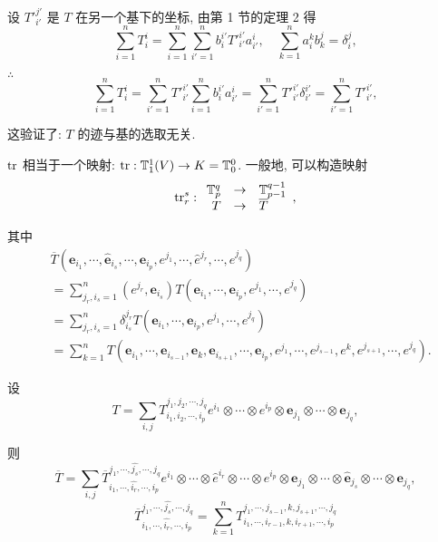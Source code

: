 \documentclass{ctexart}
\begin{document}
设 ${T'}_{i'}^{j'}$ 是 $T$ 在另一个基下的坐标, 由第 1 节的定理 2 得
\[\sum\limits_{i=1}^nT_i^i=\sum\limits_{i=1}^n\sum\limits_{i'=1}^nb_i^{i'}{T'}_{i'}^{i'}a_{i'}^i,\quad\sum\limits_{k=1}^na_i^kb_k^j=\delta_i^j,\]

$\therefore$
\[\sum\limits_{i=1}^nT_i^i=\sum\limits_{i'=1}^n{T'}_{i'}^{i'}\sum\limits_{i=1}^nb_i^{i'}a_{i'}^i=\sum\limits_{i'=1}^n{T'}_{i'}^{i'}\delta_{i'}^{i'}=\sum\limits_{i'=1}^n{T'}_{i'}^{i'},\]

这验证了: $T$ 的迹与基的选取无关.

$\operatorname{tr} $ 相当于一个映射: $\operatorname{tr} :\mathbb{T}_1^1(V)\to K=\mathbb{T}_0^0$. 一般地, 可以构造映射
\[\operatorname{tr} _r^s:\begin{array}{rcl}
    \mathbb{T}_p^q & \to & \mathbb{T}_{p-1}^{q-1} \\
    T & \to & \overline{T} \\
\end{array},\]

其中
\begin{align*}
    & \overline{T}(\boldsymbol{e}_{i_1},\cdots,\hat{\boldsymbol{e}}_{i_s},\cdots,\boldsymbol{e}_{i_p},e^{j_1},\cdots,\hat{e}^{j_r},\cdots,e^{j_q}) \\
    & =\sum\limits_{j_r,i_s=1}^n(e^{j_r},\boldsymbol{e}_{i_s})T(\boldsymbol{e}_{i_1},\cdots,\boldsymbol{e}_{i_p},e^{j_1},\cdots,e^{j_q}) \\
    & =\sum\limits_{j_r,i_s=1}^n\delta_{i_s}^{j_r}T(\boldsymbol{e}_{i_1},\cdots,\boldsymbol{e}_{i_p},e^{j_1},\cdots,e^{j_q}) \\
    & =\sum\limits_{k=1}^nT(\boldsymbol{e}_{i_1},\cdots,\boldsymbol{e}_{i_{s-1}},\boldsymbol{e}_k,\boldsymbol{e}_{i_{s+1}},\cdots,\boldsymbol{e}_{i_p},e^{j_1},\cdots,e^{j_{s-1}},e^{k},e^{j_{s+1}},\cdots,e^{j_q}).
\end{align*}

设
\[T=\sum\limits_{i,j}T^{j_1,j_2,\cdots,j_q}_{i_1,i_2,\cdots,i_p}e^{i_1}\otimes\cdots\otimes e^{i_p}\otimes\boldsymbol{e}_{j_1}\otimes\cdots\otimes\boldsymbol{e}_{j_q},\]

则
\[\overline{T}=\sum\limits_{i,j}\overline{T}^{j_1,\cdots,\widehat{j_s},\cdots,j_q}_{i_1,\cdots,\widehat{i_r},\cdots,i_p}e^{i_1}\otimes\cdots\otimes\hat{e}^{i_r}\otimes\cdots\otimes e^{i_p}\otimes\boldsymbol{e}_{j_1}\otimes\cdots\otimes\hat{\boldsymbol{e}}_{j_s}\otimes\cdots\otimes\boldsymbol{e}_{j_q},\]
\[\overline{T}^{j_1,\cdots,\widehat{j_s},\cdots,j_q}_{i_1,\cdots,\widehat{i_r},\cdots,i_p}=\sum\limits_{k=1}^nT^{j_1,\cdots,j_{s-1},k,j_{s+1},\cdots,j_q}_{i_1,\cdots,i_{r-1},k,i_{r+1},\cdots,i_p}\]
\end{document}
